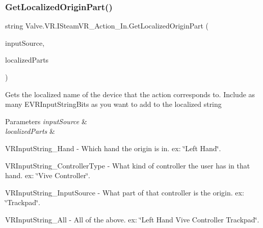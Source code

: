 \mbox{\label{interface_valve_1_1_v_r_1_1_i_steam_v_r___action___in_aa4ff7b17b61ea2e9ab5fe8421ed5e877}} 
\subsubsection{\texorpdfstring{GetLocalizedOriginPart()}{GetLocalizedOriginPart()}}
{\footnotesize\ttfamily string Valve.\+V\+R.\+I\+Steam\+V\+R\+\_\+\+Action\+\_\+\+In.\+Get\+Localized\+Origin\+Part (\begin{DoxyParamCaption}\item[{\mbox{\hyperlink{namespace_valve_1_1_v_r_a82e5bf501cc3aa155444ee3f0662853f}{Steam\+V\+R\+\_\+\+Input\+\_\+\+Sources}}}]{input\+Source,  }\item[{params \mbox{\hyperlink{namespace_valve_1_1_v_r_a05e76187bbc5846b9bfb44f6acf13912}{E\+V\+R\+Input\+String\+Bits}} \mbox{[}$\,$\mbox{]}}]{localized\+Parts }\end{DoxyParamCaption})}



Gets the localized name of the device that the action corresponds to. Include as many E\+V\+R\+Input\+String\+Bits as you want to add to the localized string 


\begin{DoxyParams}{Parameters}
{\em input\+Source} & \\
\hline
{\em localized\+Parts} & 
\begin{DoxyItemize}
\item V\+R\+Input\+String\+\_\+\+Hand -\/ Which hand the origin is in. ex\+: \char`\"{}\+Left Hand\char`\"{}.  
\item V\+R\+Input\+String\+\_\+\+Controller\+Type -\/ What kind of controller the user has in that hand. ex\+: \char`\"{}\+Vive Controller\char`\"{}.  
\item V\+R\+Input\+String\+\_\+\+Input\+Source -\/ What part of that controller is the origin. ex\+: \char`\"{}\+Trackpad\char`\"{}.  
\item V\+R\+Input\+String\+\_\+\+All -\/ All of the above. ex\+: \char`\"{}\+Left Hand Vive Controller Trackpad\char`\"{}.  
\end{DoxyItemize}\\
\hline
\end{DoxyParams}


